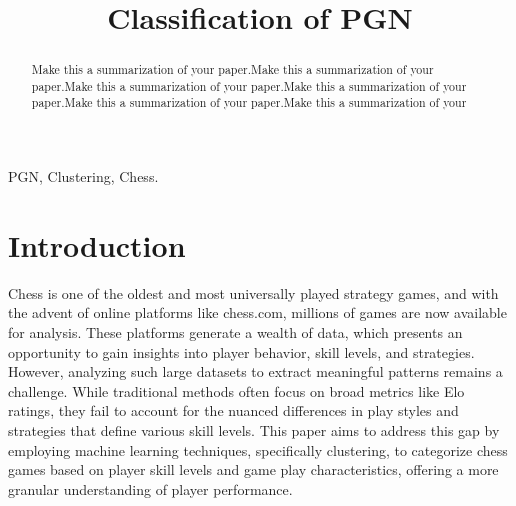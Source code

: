 \documentclass[conference]{IEEEtran}
\begin{document}
\title{Classification of PGN\\
}

\author{
\and
{}


}

\maketitle

\begin{abstract}
Make this a summarization of your paper.Make this a summarization of your paper.Make this a summarization of your paper.Make this a summarization of your paper.Make this a summarization of your paper.Make this a summarization of your 
\end{abstract}

\begin{IEEEkeywords}
PGN, Clustering, Chess.
\end{IEEEkeywords}

\section{Introduction}
Chess is one of the oldest and most universally played strategy games, and with the advent of online platforms like chess.com, millions of games are now available for analysis. These platforms generate a wealth of data, which presents an opportunity to gain insights into player behavior, skill levels, and strategies. However, analyzing such large datasets to extract meaningful patterns remains a challenge. While traditional methods often focus on broad metrics like Elo ratings, they fail to account for the nuanced differences in play styles and strategies that define various skill levels. This paper aims to address this gap by employing machine learning techniques, specifically clustering, to categorize chess games based on player skill levels and game play characteristics, offering a more granular understanding of player performance.
\end{document}

